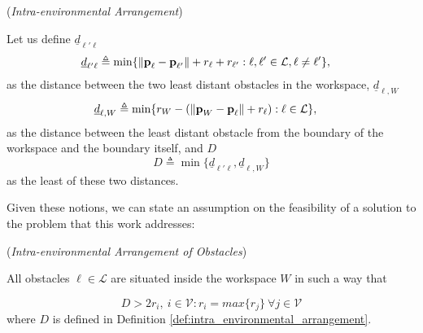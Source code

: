 \begin{bw_box}
\begin{definition} (\textit{Intra-environmental Arrangement})
\label{def:intra_environmental_arrangement}

  Let us define $\underline{d}_{\ell'\ell}$
  \begin{align}
    \underline{d}_{\ell'\ell} &\triangleq \min\{\| \bm{\mathbf{p}}_{\ell} - \bm{\mathbf{p}}_{\ell'}\| + r_{\ell} + r_{\ell'} :
      \ell,\ell' \in \mathcal{L}, \ell \neq \ell' \},
  \end{align}
  as the distance between the two least distant obstacles in the workspace,
  $\underline{d}_{\ell,W}$
  \begin{align}
    \underline{d}_{\ell,W} & \triangleq \min\{r_W - (\|\bm{\mathbf{p}}_W - \bm{\mathbf{p}}_{\ell}\| + r_{\ell}) : \ell \in \mathcal{L}\},
  \end{align}
  as the distance between the least distant obstacle from the boundary of the
  workspace and the boundary itself, and $D$
  \begin{equation}
    D \triangleq \min\{\underline{d}_{\ell'\ell}, \underline{d}_{\ell,W}\}
  \end{equation}
  as the least of these two distances.
\end{definition}
\end{bw_box}
Given these notions, we can state an assumption on the feasibility of a
solution to the problem that this work addresses:

\begin{gg_box}
  \begin{assumption}(\textit{Intra-environmental Arrangement of Obstacles})
  \label{ass:intra_environmental_arrangement}

    All obstacles $\ell \in \mathcal{L}$ are situated inside the workspace $W$
    in such a way that

  \begin{equation}
    D > 2 r_i,\ i \in \mathcal{V} : r_i = max\{r_j\}\ \forall j \in \mathcal{V}
  \label{eq:geometric_constraint}
  \end{equation}
  where $D$ is defined in Definition \eqref{def:intra_environmental_arrangement}.
\end{assumption}
\end{gg_box}
